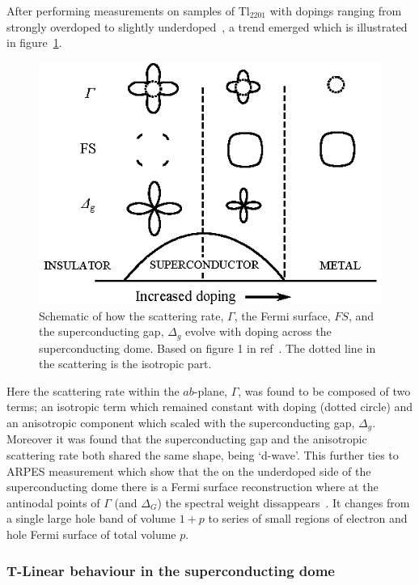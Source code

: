 After performing measurements on samples of Tl$_{2201}$ with dopings ranging from strongly overdoped to slightly underdoped~\cite{Abdel-Jawad2006}, a trend emerged which is illustrated in figure~\ref{Fig:Intro:AnisotropyPhase}. 
\begin{figure}[htbp]
    \begin{center}
        \includegraphics[scale=0.9]{Chapter-Introduction/Figures/AnisotropyPhase/AnisotropyPhase}
        \caption{Schematic of how the scattering rate, $\Gamma$, the Fermi surface, $FS$, and the superconducting gap, $\Delta_g$ evolve with doping across the superconducting dome. Based on figure 1 in ref~\cite{Taillefer2006}. The dotted line in the scattering is the isotropic part.}
        \label{Fig:Intro:AnisotropyPhase}
    \end{center}
\end{figure}
Here the scattering rate within the $ab$-plane, $\Gamma$, was found to be composed of two terms; an isotropic term which remained constant with doping (dotted circle) and an anisotropic component which scaled with the superconducting gap, $\Delta_g$. Moreover it was found that the superconducting gap and the anisotropic scattering rate both shared the same shape, being `d-wave'. This further ties to \ac{ARPES} measurement which show that the on the underdoped side of the superconducting dome there is a Fermi surface reconstruction where at the antinodal points of $\Gamma$ (and $\Delta_G$) the spectral weight dissappears~\cite{Norman2010}. It changes from a single large hole band of volume $1+p$ to series of small regions of electron and hole Fermi surface of total volume $p$.

\subsubsection{T-Linear behaviour in the superconducting dome}

